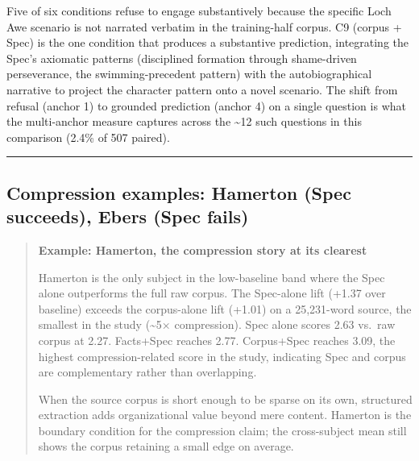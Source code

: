 Five of six conditions refuse to engage substantively because the
specific Loch Awe scenario is not narrated verbatim in the training-half
corpus. C9 (corpus + Spec) is the one condition that produces a
substantive prediction, integrating the Spec's axiomatic patterns
(disciplined formation through shame-driven perseverance, the
swimming-precedent pattern) with the autobiographical narrative to
project the character pattern onto a novel scenario. The shift from
refusal (anchor 1) to grounded prediction (anchor 4) on a single
question is what the multi-anchor measure captures across the
\textasciitilde12 such questions in this comparison (2.4\% of 507
paired).

\begin{center}\rule{0.5\linewidth}{0.5pt}\end{center}

\hypertarget{compression-examples-hamerton-spec-succeeds-ebers-spec-fails}{%
\subsection{Compression examples: Hamerton (Spec succeeds), Ebers (Spec
fails)}\label{compression-examples-hamerton-spec-succeeds-ebers-spec-fails}}

\begin{quote}
\textbf{Example: Hamerton, the compression story at its clearest}

Hamerton is the only subject in the low-baseline band where the Spec
alone outperforms the full raw corpus. The Spec-alone lift (+1.37 over
baseline) exceeds the corpus-alone lift (+1.01) on a 25,231-word source,
the smallest in the study (\textasciitilde5× compression). Spec alone
scores 2.63 vs.~raw corpus at 2.27. Facts+Spec reaches 2.77. Corpus+Spec
reaches 3.09, the highest compression-related score in the study,
indicating Spec and corpus are complementary rather than overlapping.

When the source corpus is short enough to be sparse on its own,
structured extraction adds organizational value beyond mere content.
Hamerton is the boundary condition for the compression claim; the
cross-subject mean still shows the corpus retaining a small edge on
average.
\end{quote}

